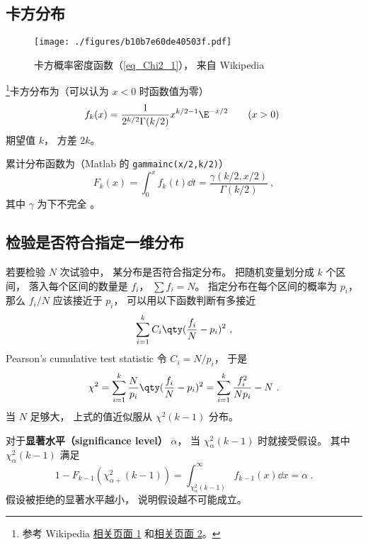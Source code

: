 
\begin{issues}
\issueDraft
\end{issues}

\subsection{卡方分布}
\begin{figure}[ht]
\centering
\texttt{[image: ./figures/b10b7e60de40503f.pdf]}
\caption{卡方概率密度函数（\autoref{eq_Chi2_1}）， 来自 Wikipedia} \label{fig_Chi2_1}
\end{figure}

\footnote{参考 Wikipedia \href{https://en.wikipedia.org/wiki/Chi-squared_distribution}{相关页面 1} 和\href{https://en.wikipedia.org/wiki/Pearson's_chi-squared_test}{相关页面 2}。}卡方分布为（可以认为 $x<0$ 时函数值为零）
\begin{equation}\label{eq_Chi2_1}
f_k(x) = \frac{1}{2^{k/2}\Gamma(k/2)}x^{k/2-1}\E^{-x/2} \qquad (x > 0)~
\end{equation}
期望值 $k$， 方差 $2k$。

累计分布函数为（Matlab 的 \verb|gammainc(x/2,k/2)|）
\begin{equation}
F_k(x) = \int_0^{x} f_k(t) \dd{t} = \frac{\gamma(k/2, x/2)}{\Gamma(k/2)}~,
\end{equation}
其中 $\gamma$ 为下不完全 。

\subsection{检验是否符合指定一维分布}
若要检验 $N$ 次试验中， 某分布是否符合指定分布。 把随机变量划分成 $k$ 个区间， 落入每个区间的数量是 $f_i$， $\sum f_i = N$。 指定分布在每个区间的概率为 $p_i$， 那么 $f_i/N$ 应该接近于 $p_i$， 可以用以下函数判断有多接近
\begin{equation}
\sum_{i=1}^k C_i \qty(\frac{f_i}{N} - p_i)^2~,
\end{equation}
Pearson's cumulative test statistic 令 $C_i = N/p_i$， 于是
\begin{equation}
\chi^2 = \sum_{i=1}^k \frac{N}{p_i} \qty(\frac{f_i}{N} - p_i)^2 = \sum_{i=1}^k \frac{f_i^2}{Np_i} - N~.
\end{equation}
当 $N$ 足够大， 上式的值近似服从 $\chi^2(k-1)$ 分布。

对于\textbf{显著水平（significance level）} $\alpha$， 当 $\chi_{\alpha}^2(k-1)$ 时就接受假设。 其中 $\chi_{\alpha}^2(k-1)$ 满足
\begin{equation}
1 - F_{k-1}(\chi_{\alpha+}^2(k-1)) = \int_{\chi_{\alpha}^2(k-1)}^\infty f_{k-1}(x) \dd{x} = \alpha~.
\end{equation}
假设被拒绝的显著水平越小， 说明假设越不可能成立。

